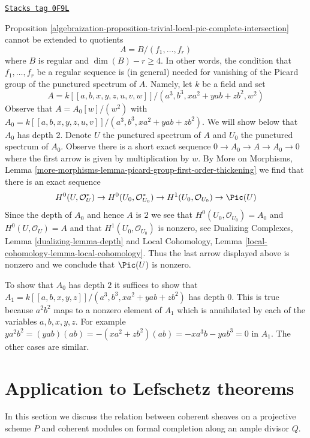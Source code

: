 \begin{example}
\label{algebraization-example-grothendieck-sharp-bis}
\href{https://stacks.math.columbia.edu/tag/0F9L}{\texttt{Stacks tag 0F9L}}

Proposition \ref{algebraization-proposition-trivial-local-pic-complete-intersection}
cannot be extended to quotients
$$
A = B/(f_1, \ldots, f_r)
$$
where $B$ is regular and $\dim(B) - r \geq 4$. In other words, the condition
that $f_1, \ldots, f_r$ be a regular sequence is (in general) needed
for vanishing of the Picard group of the punctured spectrum of $A$.
Namely, let $k$ be a field and set
$$
A = k[[a, b, x, y, z, u, v, w]]/(a^3, b^3, xa^2 + yab + zb^2, w^2)
$$
Observe that $A = A_0[w]/(w^2)$ with
$A_0 = k[[a, b, x, y, z, u, v]]/(a^3, b^3, xa^2 + yab + zb^2)$.
We will show below that $A_0$ has depth $2$.
Denote $U$ the punctured spectrum of $A$ and $U_0$ the punctured
spectrum of $A_0$. Observe there is a short exact sequence
$0 \to A_0 \to A \to A_0 \to 0$ where the first arrow is
given by multiplication by $w$.
By More on Morphisms, Lemma
\ref{more-morphisms-lemma-picard-group-first-order-thickening}
we find that there is an exact sequence
$$
H^0(U, \mathcal{O}_U^*) \to
H^0(U_0, \mathcal{O}_{U_0}^*) \to
H^1(U_0, \mathcal{O}_{U_0}) \to
\Pic(U)
$$
Since the depth of $A_0$ and hence $A$ is $2$ we see that
$H^0(U_0, \mathcal{O}_{U_0}) = A_0$ and $H^0(U, \mathcal{O}_U) = A$
and that $H^1(U_0, \mathcal{O}_{U_0})$ is nonzero, see
Dualizing Complexes, Lemma \ref{dualizing-lemma-depth} and
Local Cohomology, Lemma \ref{local-cohomology-lemma-local-cohomology}.
Thus the last arrow displayed above is nonzero and we conclude
that $\Pic(U)$ is nonzero.

\medskip\noindent
To show that $A_0$ has depth $2$ it suffices to show that
$A_1 = k[[a, b, x, y, z]]/(a^3, b^3, xa^2 + yab + zb^2)$
has depth $0$. This is true because $a^2b^2$ maps to
a nonzero element of $A_1$ which is annihilated
by each of the variables $a, b, x, y, z$. For example
$ya^2b^2 = (yab)(ab) = - (xa^2 + zb^2)(ab) = -xa^3b - yab^3 = 0$ in $A_1$.
The other cases are similar.
\end{example}

\section{Application to Lefschetz theorems}
\label{algebraization-section-lefschetz}
In this section we discuss the relation between coherent sheaves on a
projective scheme $P$ and coherent modules on formal completion along
an ample divisor $Q$.

